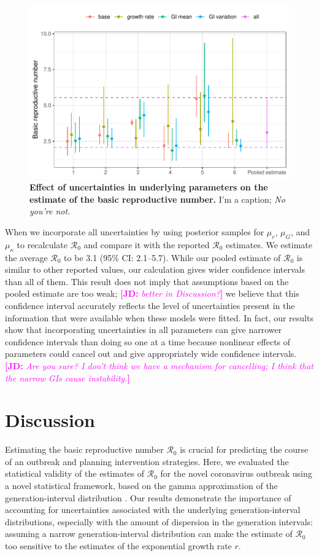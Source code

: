\documentclass[12pt]{article}
\newcommand{\comment}[3]{\textcolor{#1}{\textbf{[#2: }\textsl{#3}\textbf{]}}}
\newcommand{\jd}[1]{\comment{magenta}{JD}{#1}}
\begin{document}
\begin{figure}[t]
\includegraphics[width=\textwidth]{compare_R0.pdf}
\caption{
\textbf{Effect of uncertainties in underlying parameters on the estimate of the basic reproductive number.}
I'm a caption; \emph{No you're not.}
}
\label{fig:R0}
\end{figure}

When we incorporate all uncertainties by using posterior samples for $\mu_r$, $\mu_G$, and $\mu_\kappa$ to recalculate $\mathcal R_0$ and compare it with the reported $\mathcal R_0$ estimates.
We estimate the average $\mathcal R_0$ to be 3.1 (95\% CI: 2.1--5.7).
While our pooled estimate of $\mathcal R_0$ is similar to other reported values, our calculation gives wider confidence intervals than all of them.
This result does not imply that assumptions based on the pooled estimate are too weak; \jd{better in Discussion?}
we believe that this confidence interval accurately reflects the level of uncertainties present in the information that were available when these models were fitted.
In fact, our results show that incorporating uncertainties in all parameters can give narrower confidence intervals than doing so one at a time because nonlinear effects of parameters could cancel out and give appropriately wide confidence intervals. \jd{Are you sure? I don't think we have a mechanism for cancelling; I think that the narrow GIs cause instability.}

\section{Discussion}

Estimating the basic reproductive number $\mathcal R_0$ is crucial for predicting the course of an outbreak and planning intervention strategies.
Here, we evaluated the statistical validity of the estimates of $\mathcal R_0$ for the novel coronavirus outbreak using a novel statistical framework, based on the gamma approximation of the generation-interval distribution \citep{park2019practical}.
Our results demonstrate the importance of accounting for uncertainties associated with the underlying generation-interval distributions, especially with the amount of dispersion in the generation intervals:
assuming a narrow generation-interval distribution can make the estimate of $\mathcal R_0$ too sensitive to the estimates of the exponential growth rate $r$.
\end{document}
